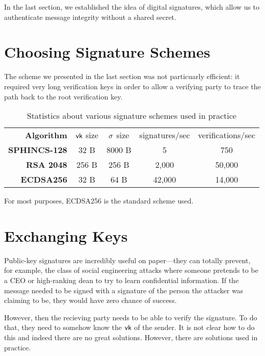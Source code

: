 In the last section, we established the idea of digital signatures, which allow us to authenticate message integrity without a shared secret.

\section{Choosing Signature Schemes}
The scheme we presented in the last section was not particuarly efficient: it required very long verification keys in order to allow a verifying party to trace the path back to the root verification key. 

\begin{table}[htpb]
	\centering
	\caption{Statistics about various signature schemes used in practice}
	\label{tab:sig_schemes}

	\begin{tabular}{rcccc}
		\textbf{Algorithm} & $\mathsf{vk}$ size & $\sigma$ size & signatures/sec & verifications/sec \\
		\bf{SPHINCS-128} & 32 B & 8000 B & 5 & 750 \\
		\bf{RSA 2048} & 256 B & 256 B & 2,000 & 50,000 \\
		\bf{ECDSA256} & 32 B & 64 B & 42,000 & 14,000 \\
	\end{tabular}
\end{table}

For most purposes, ECDSA256 is the standard scheme used. 

\section{Exchanging Keys}
Public-key signatures are incredibly useful on paper---they can totally prevent, for example, the class of social engineering attacks where someone pretends to be a CEO or high-ranking dean to try to learn confidential information. If the message needed to be signed with a signature of the person the attacker was claiming to be, they would have zero chance of success. 

However, then the recieving party needs to be able to verify the signature. To do that, they need to somehow know the $\mathsf{vk}$ of the sender. It is not clear how to do this and indeed there are no great solutions. However, there are solutions used in practice.

